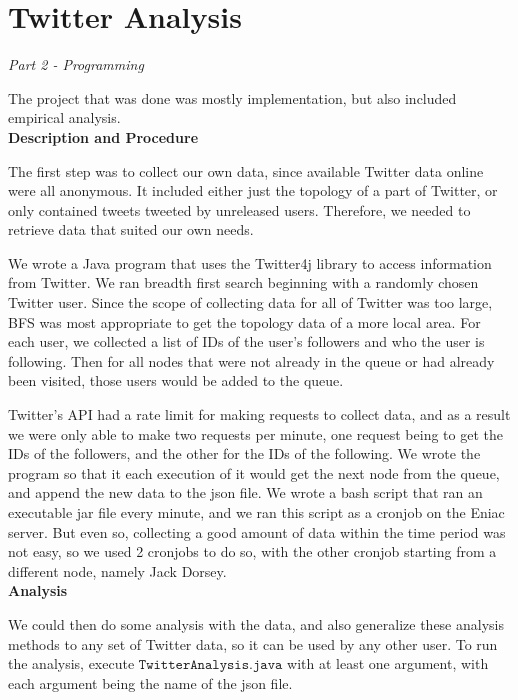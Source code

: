 \documentclass[letterpaper]{article}
\begin{document}
\pagestyle{fancy}
\section*{Twitter Analysis}
\textit{Part 2 - Programming}

The project that was done was mostly implementation, but also included empirical analysis.\\

\noindent\textbf{Description and Procedure}

The first step was to collect our own data, since available Twitter data online were all anonymous. It included either just the topology of a part of Twitter, or only contained tweets tweeted by unreleased users. Therefore, we needed to retrieve data that suited our own needs.

We wrote a Java program that uses the Twitter4j library to access information from Twitter. We ran breadth first search beginning with a randomly chosen Twitter user. Since the scope of collecting data for all of Twitter was too large, BFS was most appropriate to get the topology data of a more local area. For each user, we collected a list of IDs of the user's followers and who the user is following. Then for all nodes that were not already in the queue or had already been visited, those users would be added to the queue.

Twitter's API had a rate limit for making requests to collect data, and as a result we were only able to make two requests per minute, one request being to get the IDs of the followers, and the other for the IDs of the following. We wrote the program so that it each execution of it would get the next node from the queue, and append the new data to the json file. We wrote a bash script that ran an executable jar file every minute, and we ran this script as a cronjob on the Eniac server. But even so, collecting a good amount of data within the time period was not easy, so we used 2 cronjobs to do so, with the other cronjob starting from a different node, namely Jack Dorsey.\\

\noindent\textbf{Analysis}

We could then do some analysis with the data, and also generalize these analysis methods to any set of Twitter data, so it can be used by any other user. To run the analysis, execute $\texttt{TwitterAnalysis.java}$ with at least one argument, with each argument being the name of the json file.
\end{document}
